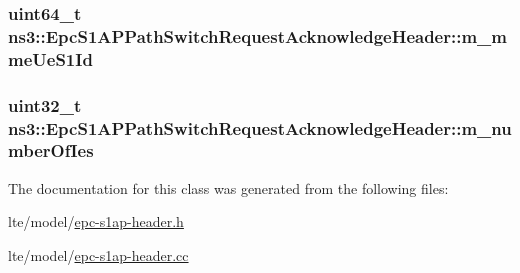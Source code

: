 \subsubsection[{\texorpdfstring{m\+\_\+mme\+Ue\+S1\+Id}{m_mmeUeS1Id}}]{\setlength{\rightskip}{0pt plus 5cm}uint64\+\_\+t ns3\+::\+Epc\+S1\+A\+P\+Path\+Switch\+Request\+Acknowledge\+Header\+::m\+\_\+mme\+Ue\+S1\+Id\hspace{0.3cm}{\ttfamily [private]}}\hypertarget{classns3_1_1EpcS1APPathSwitchRequestAcknowledgeHeader_a5e3e51c30edadc0174d3e17f1dfc35f6}{}\label{classns3_1_1EpcS1APPathSwitchRequestAcknowledgeHeader_a5e3e51c30edadc0174d3e17f1dfc35f6}
\subsubsection[{\texorpdfstring{m\+\_\+number\+Of\+Ies}{m_numberOfIes}}]{\setlength{\rightskip}{0pt plus 5cm}uint32\+\_\+t ns3\+::\+Epc\+S1\+A\+P\+Path\+Switch\+Request\+Acknowledge\+Header\+::m\+\_\+number\+Of\+Ies\hspace{0.3cm}{\ttfamily [private]}}\hypertarget{classns3_1_1EpcS1APPathSwitchRequestAcknowledgeHeader_a393eb3652a4fa93567b1310c95a24c34}{}\label{classns3_1_1EpcS1APPathSwitchRequestAcknowledgeHeader_a393eb3652a4fa93567b1310c95a24c34}


The documentation for this class was generated from the following files\+:\begin{DoxyCompactItemize}
\item 
lte/model/\hyperlink{epc-s1ap-header_8h}{epc-\/s1ap-\/header.\+h}\item 
lte/model/\hyperlink{epc-s1ap-header_8cc}{epc-\/s1ap-\/header.\+cc}\end{DoxyCompactItemize}
